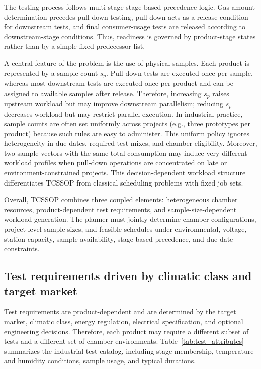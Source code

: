 \documentclass[11pt]{article}
\begin{document}
The testing process follows multi-stage stage-based precedence logic. Gas amount determination precedes pull-down testing, pull-down acts as a release condition for downstream tests, and final consumer-usage tests are released according to downstream-stage conditions. Thus, readiness is governed by product-stage states rather than by a simple fixed predecessor list.

A central feature of the problem is the use of physical samples. Each product is represented by a sample count \(s_p\). Pull-down tests are executed once per sample, whereas most downstream tests are executed once per product and can be assigned to available samples after release. Therefore, increasing \(s_p\) raises upstream workload but may improve downstream parallelism; reducing \(s_p\) decreases workload but may restrict parallel execution. In industrial practice, sample counts are often set uniformly across projects (e.g., three prototypes per product) because such rules are easy to administer. This uniform policy ignores heterogeneity in due dates, required test mixes, and chamber eligibility. Moreover, two sample vectors with the same total consumption may induce very different workload profiles when pull-down operations are concentrated on late or environment-constrained projects. This decision-dependent workload structure differentiates TCSSOP from classical scheduling problems with fixed job sets.

Overall, TCSSOP combines three coupled elements: heterogeneous chamber resources, product-dependent test requirements, and sample-size-dependent workload generation. The planner must jointly determine chamber configurations, project-level sample sizes, and feasible schedules under environmental, voltage, station-capacity, sample-availability, stage-based precedence, and due-date constraints.

\subsection{Test requirements driven by climatic class and target market}
\label{subsec:test_requirements}

Test requirements are product-dependent and are determined by the target market, climatic class, energy regulation, electrical specification, and optional engineering decisions. Therefore, each product may require a different subset of tests and a different set of chamber environments. Table~\ref{tab:test_attributes} summarizes the industrial test catalog, including stage membership, temperature and humidity conditions, sample usage, and typical durations.
\end{document}
